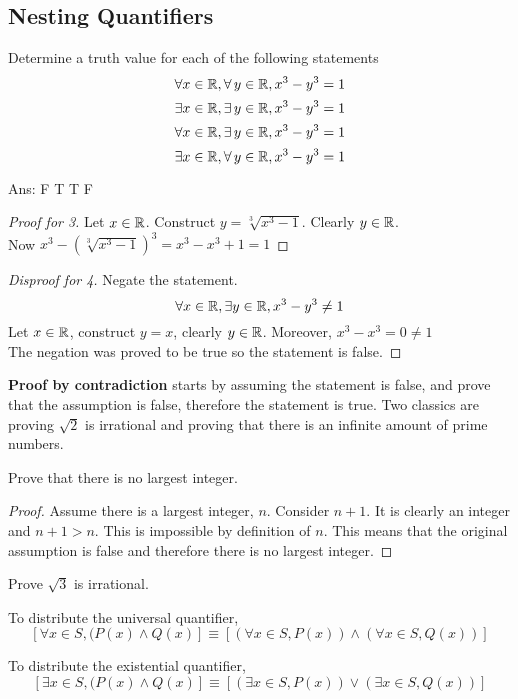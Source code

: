 \documentclass[english, 12pt]{article}
\begin{document}
\subsection{Nesting Quantifiers}
\begin{exmp}
Determine a truth value for each of the following statements
\[ \forall x \in {\mathbb{R}}, \forall\, y \in {\mathbb{R}}, x^3-y^3 = 1\]
\[ \exists x \in {\mathbb{R}} , \exists\, y \in {\mathbb{R}}, x^3-y^3 = 1\]
\[ \forall x \in {\mathbb{R}} , \exists\, y \in {\mathbb{R}}, x^3-y^3=1\]
\[ \exists x \in {\mathbb{R}}, \forall\, y \in {\mathbb{R}}, x^3-y^3=1\]
\begin{center}
Ans: F T T F
\end{center}
\end{exmp}
\begin{proof}[Proof for 3]
Let $x \in {\mathbb{R}}$. Construct $y=\sqrt[3]{x^3-1}$. Clearly $y \in {\mathbb{R}}$.\\ Now $x^3 - (\sqrt[3]{x^3-1})^3 = x^3 - x^3 + 1 = 1$
\end{proof}
\begin{proof}[Disproof for 4]
Negate the statement.
\[ \forall x \in {\mathbb{R}}, \exists y \in {\mathbb{R}}, x^3-y^3 \neq 1 \]
Let $x \in {\mathbb{R}}$, construct $y=x$, clearly $y \in {\mathbb{R}}$. Moreover, $x^3-x^3 = 0 \neq 1$\\
The negation was proved to be true so the statement is false.
\end{proof}

\begin{mthd}
\textbf{Proof by contradiction} starts by assuming the statement is false, and prove that the assumption is false, therefore the statement is true. Two classics are proving $\sqrt 2$ is irrational and proving that there is an infinite amount of prime numbers.
\end{mthd}

\begin{exmp}
Prove that there is no largest integer.
\begin{proof}
Assume there is a largest integer, $n$. Consider $n+1$. It is clearly an integer and $n+1 > n$. This is impossible by definition of $n$. This means that the original assumption is false and therefore there is no largest integer.
\end{proof}
\end{exmp}

\begin{exercise}
Prove $\sqrt 3$ is irrational.
\end{exercise}
\begin{defn}
To distribute the universal quantifier,
\[ [\forall x \in S, (P(x) \land Q(x)] \equiv [(\forall x \in S, P(x))\land (\forall x \in S, Q(x))] \]
\end{defn}
\begin{defn}
To distribute the existential quantifier,
\[ [\exists x \in S, (P(x) \land Q(x)] \equiv [(\exists x \in S, P(x))\lor (\exists x \in S, Q(x))] \]
\end{defn}
\end{document}
